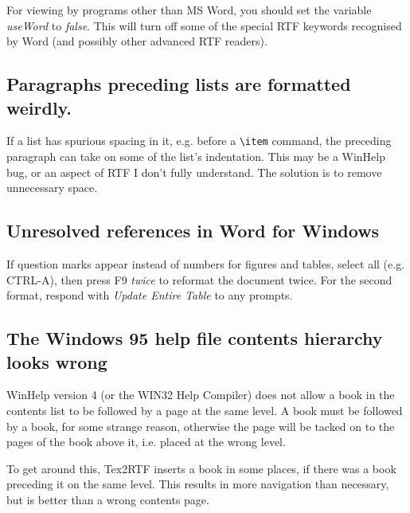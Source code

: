 For viewing by programs other than MS Word, you should set the variable {\it useWord} to {\it false}. This
will turn off some of the special RTF keywords recognised by Word (and possibly other advanced RTF readers).

\subsection{Paragraphs preceding lists are formatted weirdly.}

If a list has spurious spacing in it, e.g. before a \verb$\item$ command, the preceding
paragraph can take on some of the list's indentation. This may be a WinHelp bug, or an aspect
of RTF I don't fully understand. The solution is to remove unnecessary space.

\subsection{Unresolved references in Word for Windows}%

If question marks appear instead of numbers for figures and tables,
select all (e.g. CTRL-A), then press F9 {\it twice} to reformat the
document twice. For the second format, respond with {\it Update Entire
Table} to any prompts.

\subsection{The Windows 95 help file contents hierarchy looks wrong}%

WinHelp version 4 (or the WIN32 Help Compiler) does not allow a
book in the contents list to be followed by a page at the same level.
A book must be followed by a book, for some strange reason, otherwise
the page will be tacked on to the pages of the book above it, i.e. placed
at the wrong level.

To get around this, Tex2RTF inserts a book in some places, if there
was a book preceding it on the same level. This results in more
navigation than necessary, but is better than a wrong contents page.

\newpage

\nocite{smart93a}%
\nocite{kopka}%
\nocite{pfeiffer}%


%
\setfooter{\thepage}{}{}{}{}{\thepage}%

